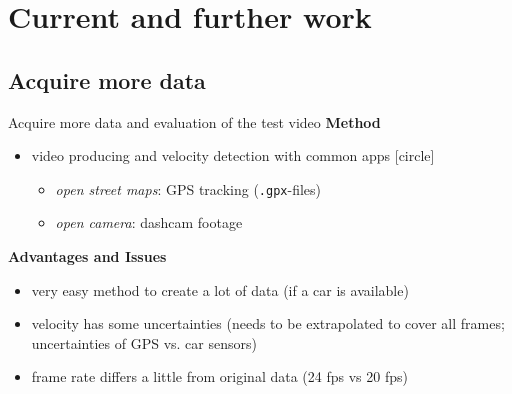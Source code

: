 \section{Current and further work}

\subsection{Acquire more data}
\begin{frame}{Acquire more data and evaluation of the test video}
	\textbf{Method}
	\begin{itemize}
		\item video producing and velocity detection with common apps
		[circle]
		\begin{itemize}
		\item \textit{open street maps}: GPS tracking (\texttt{.gpx}-files)
		\item \textit{open camera}: dashcam footage
		\end{itemize}				
	\end{itemize}
	\textbf{Advantages and Issues}
	\begin{itemize}
		\item very easy method to create a lot of data (if a car is available)
		\item velocity has some uncertainties (needs to be extrapolated to cover all frames; uncertainties of GPS vs. car sensors)
		\item frame rate differs a little from original data (24 fps vs 20 fps)
	\end{itemize}
\end{frame}

